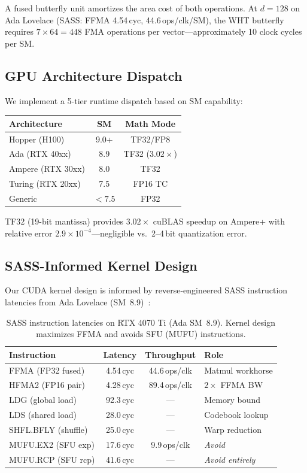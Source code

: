 \documentclass[sigconf,anonymous,review]{acmart}
\begin{document}
A fused butterfly unit amortizes the area cost of both operations.
At $d=128$ on Ada Lovelace (SASS: FFMA 4.54\,cyc, 44.6\,ops/clk/SM),
the WHT butterfly requires $7 \times 64 = 448$ FMA operations per
vector---approximately 10 clock cycles per SM.

\subsection{GPU Architecture Dispatch}

We implement a 5-tier runtime dispatch based on SM capability:

\begin{center}
\begin{tabular}{lcc}
\toprule
Architecture & SM & Math Mode \\
\midrule
Hopper (H100)      & 9.0+ & TF32/FP8 \\
Ada (RTX 40xx)     & 8.9  & TF32 ($3.02\times$) \\
Ampere (RTX 30xx)  & 8.0  & TF32 \\
Turing (RTX 20xx)  & 7.5  & FP16 TC \\
Generic            & ${<}7.5$ & FP32 \\
\bottomrule
\end{tabular}
\end{center}

TF32 (19-bit mantissa) provides $3.02\times$ cuBLAS speedup on Ampere+
with relative error $2.9 \times 10^{-4}$---negligible vs.\ 2--4\,bit
quantization error.

\subsection{SASS-Informed Kernel Design}

Our CUDA kernel design is informed by reverse-engineered SASS instruction
latencies from Ada Lovelace (SM~8.9)~\cite{steinmarder}:

\begin{table}[t]
\centering
\caption{SASS instruction latencies on RTX 4070 Ti (Ada SM~8.9).
Kernel design maximizes FFMA and avoids SFU (MUFU) instructions.}
\label{tab:sass}
\begin{tabular}{lccl}
\toprule
Instruction & Latency & Throughput & Role \\
\midrule
FFMA (FP32 fused) & 4.54\,cyc & 44.6\,ops/clk & Matmul workhorse \\
HFMA2 (FP16 pair) & 4.28\,cyc & 89.4\,ops/clk & $2\times$ FFMA BW \\
LDG (global load) & 92.3\,cyc & --- & Memory bound \\
LDS (shared load) & 28.0\,cyc & --- & Codebook lookup \\
SHFL.BFLY (shuffle) & 25.0\,cyc & --- & Warp reduction \\
MUFU.EX2 (SFU exp) & 17.6\,cyc & 9.9\,ops/clk & \emph{Avoid} \\
MUFU.RCP (SFU rcp) & 41.6\,cyc & --- & \emph{Avoid entirely} \\
\bottomrule
\end{tabular}
\end{table}
\end{document}
